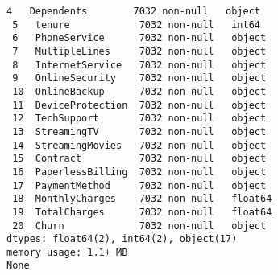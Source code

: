 \documentclass[11pt]{article}
\begin{document}
\begin{Verbatim}[commandchars=\\\{\}]
 4   Dependents        7032 non-null   object
 5   tenure            7032 non-null   int64
 6   PhoneService      7032 non-null   object
 7   MultipleLines     7032 non-null   object
 8   InternetService   7032 non-null   object
 9   OnlineSecurity    7032 non-null   object
 10  OnlineBackup      7032 non-null   object
 11  DeviceProtection  7032 non-null   object
 12  TechSupport       7032 non-null   object
 13  StreamingTV       7032 non-null   object
 14  StreamingMovies   7032 non-null   object
 15  Contract          7032 non-null   object
 16  PaperlessBilling  7032 non-null   object
 17  PaymentMethod     7032 non-null   object
 18  MonthlyCharges    7032 non-null   float64
 19  TotalCharges      7032 non-null   float64
 20  Churn             7032 non-null   object
dtypes: float64(2), int64(2), object(17)
memory usage: 1.1+ MB
None
    \end{Verbatim}
\end{document}
